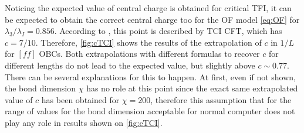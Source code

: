 	Noticing the expected value of central charge is obtained for critical TFI, it can be expected to obtain the correct central charge too for the OF model \eqref{eq:OF} for $\lambda_3/\lambda_I = 0.856$. According to \cite{obrien2018}, this point is described by TCI CFT, which has $c=7/10$. Therefore, \autoref{fig:cTCI} shows the results of the extrapolation of $c$ in $1/L$ for $[ff]$ OBCs. Both extrapolations with different formulas to recover $c$ for different lengths do not lead to the expected value, but slightly above $c\sim 0.77$. There can be several explanations for this to happen. At first, even if not shown, the bond dimension $\chi$ has no role at this point since the exact same extrapolated value of $c$ has been obtained for $\chi=200$, therefore this assumption that for the range of values for the bond dimension acceptable for normal computer does not play any role in results shown on \autoref{fig:cTCI}.

